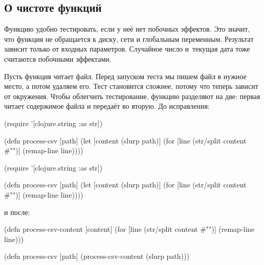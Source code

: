 \subsection{О чистоте функций}


Функцию удобно тестировать, если у неё нет побочных эффектов. Это значит, что
функция не обращается к диску, сети и глобальным переменным. Результат зависит
только от входных параметров. Случайное число и~текущая дата тоже считаются
побочными эффектами.

Пусть функция читает файл. Перед запуском теста мы пишем файл в нужное место, а
потом удаляем его. Тест становится сложнее, потому что теперь зависит от
окружения. Чтобы облегчить тестирование, функцию разделяют на две: первая читает
содержимое файла и передаёт во вторую. До исправления:


\ifnarrow

\begin{english}
  \begin{clojure}
(require '[clojure.string :as str])

(defn process-csv [path]
  (let [content (slurp path)]
    (for [line (str/split content #"\n")]
      (remap-line line))))
  \end{clojure}
\end{english}

\else

\begin{english}
  \begin{clojure}
(require '[clojure.string :as str])

(defn process-csv [path]
  (let [content (slurp path)]
    (for [line (str/split content #"\n")]
      (remap-line line))))
  \end{clojure}
\end{english}

\fi

\noindent
и после:

\ifnarrow

\begin{english}
  \begin{clojure}
(defn process-csv-content [content]
  (for [line (str/split content #"\n")]
    (remap-line line)))

(defn process-csv [path]
  (process-csv-content (slurp path)))
  \end{clojure}
\end{english}

